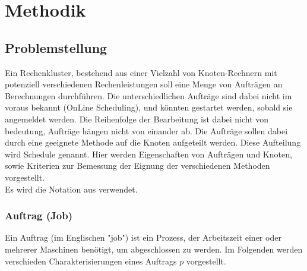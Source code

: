 \chapter{Methodik}
\label{chap:ein}
\section{Problemstellung}

Ein Rechenkluster, bestehend aus einer Vielzahl von Knoten-Rechnern mit potenziell verschiedenen Rechenleistungen soll eine Menge von Aufträgen an Berechnungen durchführen. Die unterschiedlichen Aufträge sind dabei nicht im voraus bekannt (OnLine Scheduling), und könnten gestartet werden, sobald sie angemeldet werden. Die Reihenfolge der Bearbeitung ist dabei nicht von bedeutung, Aufträge hängen nicht von einander ab. Die Aufträge sollen dabei durch eine geeignete Methode auf die Knoten aufgeteilt werden. Diese Aufteilung wird Schedule genannt. Hier werden Eigenschaften von Aufträgen und Knoten, sowie Kriterien zur Bemessung der Eignung der verschiedenen Methoden vorgestellt.\\
Es wird die Notation aus \cite{Kar97} verwendet.


\subsection{Auftrag (Job)}
Ein Auftrag (im Englischen "job") ist ein Prozess, der Arbeitszeit einer oder mehrerer Maschinen benötigt, um abgeschlossen zu werden. Im Folgenden werden verschieden Charakterisierungen eines Auftrags $p$ vorgestellt.

